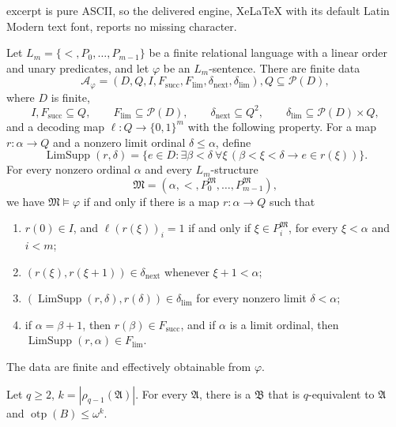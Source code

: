 \documentclass[10pt,a4paper]{amsart}
\begin{document}
excerpt is pure ASCII, so the delivered engine, XeLaTeX with its default Latin Modern text font, reports no missing character.
\begin{theorem}
\label{lem:finite-profile-scheme}
Let
$
  L_m=\{<,P_0,\ldots,P_{m-1}\}$
be a finite relational language with a linear order and unary predicates,
and let $\varphi$ be an $L_m$-sentence.  There are finite data
\[
 \mathcal A_\varphi=(D,Q,I,F_{\mathrm{succ}},F_{\mathrm{lim}},
                      \delta_{\mathrm{next}},\delta_{\mathrm{lim}}),
  Q\subseteq\mathcal P(D),
\]
where $D$ is finite,
\[
 I,F_{\mathrm{succ}}\subseteq Q,\qquad
 F_{\mathrm{lim}}\subseteq\mathcal P(D),\qquad
 \delta_{\mathrm{next}}\subseteq Q^2,\qquad
 \delta_{\mathrm{lim}}\subseteq\mathcal P(D)\times Q,
\]
and a decoding map $\ell:Q\to\{0,1\}^{m}$ with the following property.
For a map $r:\alpha\to Q$ and a nonzero limit ordinal
$\delta\leq\alpha$, define
\[
 \operatorname{LimSupp}(r,\delta)=
 \{e\in D:\exists\beta<\delta\ \forall\xi\,
       (\beta<\xi<\delta\longrightarrow e\in r(\xi))\}.
\]
For every nonzero ordinal $\alpha$ and every $L_m$-structure
\[
 \mathfrak M=(\alpha,<,P_0^{\mathfrak M},\ldots,
                         P_{m-1}^{\mathfrak M}),
\]
we have $\mathfrak M\models\varphi$ if and only if there is a map
$r:\alpha\to Q$ such that
\begin{enumerate}
  \item $r(0)\in I$, and
  $\ell(r(\xi))_i=1$ if and only if
  $\xi\in P_i^{\mathfrak M}$, for every $\xi<\alpha$ and $i<m$;
  \item $(r(\xi),r(\xi+1))\in\delta_{\mathrm{next}}$ whenever
  $\xi+1<\alpha$;
  \item $(\operatorname{LimSupp}(r,\delta),r(\delta))\in
  \delta_{\mathrm{lim}}$ for every nonzero limit
  $\delta<\alpha$;
  \item if $\alpha=\beta+1$, then $r(\beta)\in F_{\mathrm{succ}}$,
  and if $\alpha$ is a limit ordinal, then
  $\operatorname{LimSupp}(r,\alpha)\in F_{\mathrm{lim}}$.
\end{enumerate}
The data are finite and effectively obtainable from $\varphi$.
\end{theorem}

\begin{theorem}\label{thm:refined-bound}
    Let $q\geq2$, $k=|\rho_{q-1}(\mathfrak A)|$. For every $\mathfrak A$, there is a $\mathfrak B$ that is $q$-equivalent to $\mathfrak A$ and $\operatorname{otp}(B)\leq\omega^k$.
\end{theorem}
\end{document}
